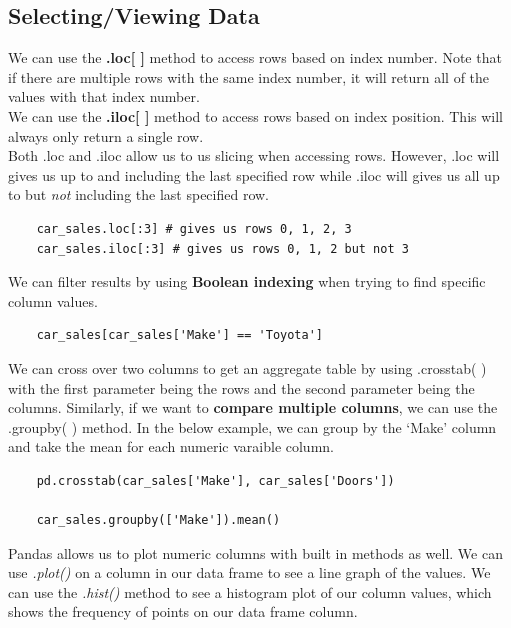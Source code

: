 \documentclass[11pt, a4paper]{article}
\begin{document}
\begin{spacing}{1.1}
	\subsection{Selecting/Viewing Data}
	We can use the \textbf{.loc[ ]} method to access rows based on index number. Note that if there are multiple rows with the same index number, it will return all of the values with that index number. \vspace*{1mm} \\
	We can use the \textbf{.iloc[ ]} method to access rows based on index position. This will always only return a single row. \vspace*{1mm} \\
	Both .loc and .iloc allow us to us slicing when accessing rows. However, .loc will gives us  up to and including the last specified row while .iloc will gives us all up to but \textit{not} including the last specified row.
	\begin{lstlisting}
	car_sales.loc[:3] # gives us rows 0, 1, 2, 3
	car_sales.iloc[:3] # gives us rows 0, 1, 2 but not 3 \end{lstlisting} \vspace*{1mm} 
	We can filter results by using \textbf{Boolean indexing} when trying to find specific column values. 
	\begin{lstlisting}
	car_sales[car_sales['Make'] == 'Toyota'] \end{lstlisting} \vspace*{1mm} 
	We can cross over two columns to get an aggregate table by using .crosstab( ) with the first parameter being the rows and the second parameter being the columns. Similarly, if we want to \textbf{compare multiple columns}, we can use the .groupby( ) method. In the below example, we can group by the `Make' column and take the mean for each numeric varaible column. 
	\begin{lstlisting}
	pd.crosstab(car_sales['Make'], car_sales['Doors']) 
	
	car_sales.groupby(['Make']).mean() \end{lstlisting} \vspace*{1mm} 
	Pandas allows us to plot numeric columns with built in methods as well. We can use \textit{.plot()} on a column in our data frame to see a line graph of the values. We can use the \textit{.hist()} method to see a histogram plot of our column values, which shows the frequency of points on our data frame column.	

\end{spacing}
\end{document}
